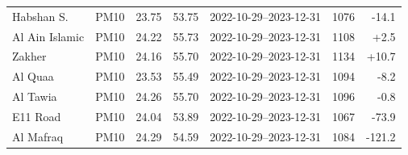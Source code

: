 \documentclass[11pt]{article}
\begin{document}
\begin{table}[htbp]
\begin{tabular}{lccccrr}
Habshan S. & PM10 & 23.75 & 53.75 & 2022-10-29--2023-12-31 & 1076 & -14.1 \\
Al Ain Islamic & PM10 & 24.22 & 55.73 & 2022-10-29--2023-12-31 & 1108 & +2.5 \\
Zakher & PM10 & 24.16 & 55.70 & 2022-10-29--2023-12-31 & 1134 & +10.7 \\
Al Qua\textquotesingle{}a & PM10 & 23.53 & 55.49 & 2022-10-29--2023-12-31 & 1094 & -8.2 \\
Al Tawia & PM10 & 24.26 & 55.70 & 2022-10-29--2023-12-31 & 1096 & -0.8 \\
E11 Road & PM10 & 24.04 & 53.89 & 2022-10-29--2023-12-31 & 1067 & -73.9 \\
Al Mafraq & PM10 & 24.29 & 54.59 & 2022-10-29--2023-12-31 & 1084 & -121.2 \\
\bottomrule\end{tabular}\end{table}
\end{document}
